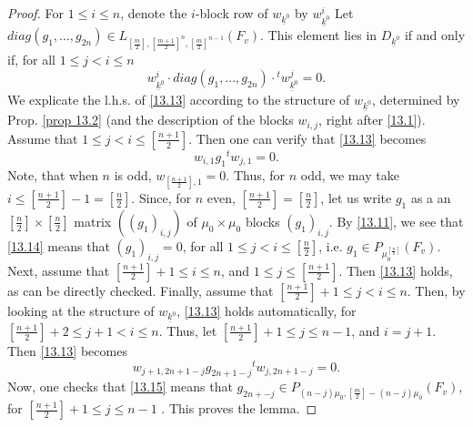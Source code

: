 \documentclass[12pts]{amsart}
\begin{document}
\begin{proof}
For $1\leq i\leq n$, denote the $i$-block row of $w_{\underline{k}^0}$ by $w^i_{\underline{k}^0}$  Let $diag(g_1,...,g_{2n})\in L_{[\frac{m}{2}],[\frac{m+1}{2}]^n,[\frac{m}{2}]^{n-1}}(F_v)$. This element lies in $D_{\underline{k}^0}$ if and only if, for all $1\leq j<i\leq n$
\begin{equation}\label{13.13}
w^i_{\underline{k}^0}\cdot diag(g_1,...,g_{2n})\cdot {}^tw^j_{\underline{k}^0}=0.
\end{equation}
We explicate the l.h.s. of \eqref{13.13} according to the structure of $w_{\underline{k}^0}$, determined by Prop. \ref{prop 13.2} (and the description of the blocks $w_{i,j}$, right after \eqref{13.1}). Assume that $1\leq j<i\leq [\frac{n+1}{2}]$. Then one can verify that \eqref{13.13} becomes
\begin{equation}\label{13.14}
w_{i,1}g_1{}^tw_{j,1}=0.
\end{equation}
Note, that when $n$ is odd, $w_{[\frac{n+1}{2}],1}=0$. Thus, for $n$ odd, we may take $i\leq [\frac{n+1}{2}]-1=[\frac{n}{2}]$. Since, for $n$ even, $[\frac{n+1}{2}]=[\frac{n}{2}]$, let us write $g_1$ as a an $[\frac{n}{2}]\times [\frac{n}{2}]$ matrix $((g_1)_{i,j})$ of $\mu_0\times \mu_0$ blocks 
$(g_1)_{i,j}$. By \eqref{13.11}, we see that \eqref{13.14} means that $(g_1)_{i,j}=0$, for all $1\leq j<i\leq [\frac{n}{2}]$, i.e. $g_1\in P_{\mu_0^{[\frac{n}{2}]}}(F_v)$. Next, assume that $[\frac{n+1}{2}]+1\leq i\leq n$, and $1\leq j\leq [\frac{n+1}{2}]$. Then \eqref{13.13} holds, as can be directly checked. Finally, assume that $[\frac{n+1}{2}]+1\leq j< i\leq n$. Then, by looking at the structure of $w_{\underline{k}^0}$, \eqref{13.13} holds automatically, for $[\frac{n+1}{2}]+2\leq j+1< i\leq n$. Thus, let $[\frac{n+1}{2}]+1\leq j\leq n-1$, and $i=j+1$. Then \eqref{13.13} becomes
\begin{equation}\label{13.15}
w_{j+1,2n+1-j}g_{2n+1-j}{}^tw_{j,2n+1-j}=0.
\end{equation}
Now, one checks that \eqref{13.15} means that $g_{2n+-j}\in P_{(n-j)\mu_0,[\frac{m}{2}]-(n-j)\mu_0}(F_v)$, for $[\frac{n+1}{2}]+1\leq j\leq n-1$ . This proves the lemma.

\end{proof}
\end{document}
